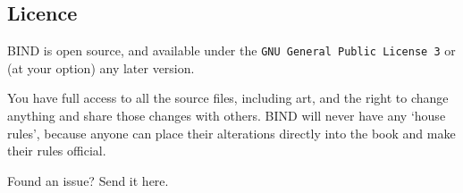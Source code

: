 \begin{multicols}{2}
\subsection*{Licence}

BIND is open source, and available under the {\tt GNU General Public License 3} or (at your option) any later version.

You have full access to all the source files, including art, and the right to change anything and share those changes with others.
BIND will never have any `house rules', because anyone can place their alterations directly into the book and make their rules official.

\begin{center}
  
  Found an issue?
  Send it here.
\end{center}

\end{multicols}

